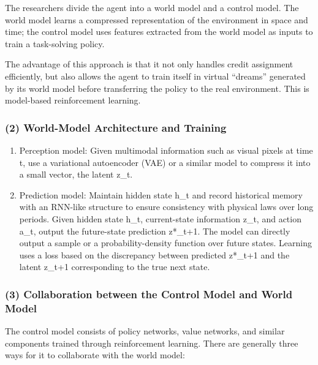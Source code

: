 The researchers divide the agent into a world model and a control model. The world model learns a compressed representation of the environment in space and time; the control model uses features extracted from the world model as inputs to train a task-solving policy.

The advantage of this approach is that it not only handles credit assignment efficiently, but also allows the agent to train itself in virtual ``dreams'' generated by its world model before transferring the policy to the real environment. This is model-based reinforcement learning.

\hypertarget{world-model-architecture-and-training}{%
\subsubsection{(2) World-Model Architecture and Training}\label{world-model-architecture-and-training}}

\begin{enumerate}
\def\labelenumi{\arabic{enumi}.}
\item
  Perception model: Given multimodal information such as visual pixels at time t, use a variational autoencoder (VAE) or a similar model to compress it into a small vector, the latent z\_t.
\item
  Prediction model: Maintain hidden state h\_t and record historical memory with an RNN-like structure to ensure consistency with physical laws over long periods. Given hidden state h\_t, current-state information z\_t, and action a\_t, output the future-state prediction z*\_t+1. The model can directly output a sample or a probability-density function over future states. Learning uses a loss based on the discrepancy between predicted z*\_t+1 and the latent z\_t+1 corresponding to the true next state.
\end{enumerate}

\hypertarget{collaboration-between-the-control-model-and-world-model}{%
\subsubsection{(3) Collaboration between the Control Model and World Model}\label{collaboration-between-the-control-model-and-world-model}}

The control model consists of policy networks, value networks, and similar components trained through reinforcement learning. There are generally three ways for it to collaborate with the world model:

